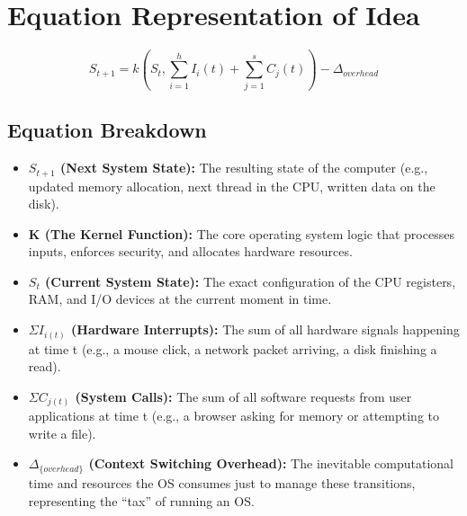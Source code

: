 \documentclass[11pt, a4paper]{article}
\begin{document}
\section*{Equation Representation of Idea}
\begin{equation}
    S_{t+1} = k \left( S_t, \sum_{i=1}^{h} I_i(t) + \sum_{j=1}^{s} C_j(t) \right) - \Delta_{overhead}
    \label{eq:os_state}
\end{equation}

\subsection*{Equation Breakdown}
\begin{itemize}
    \item \textbf{$S_{t+1}$ (Next System State):} The resulting state of the computer (e.g., updated memory allocation, next thread in the CPU, written data on the disk).
    \item \textbf{K (The Kernel Function):} The core operating system logic that processes inputs, enforces security, and allocates hardware resources.
    \item \textbf{$S_t$ (Current System State):} The exact configuration of the CPU registers, RAM, and I/O devices at the current moment in time.
    \item \textbf{$\Sigma I_{i(t)}$ (Hardware Interrupts):} The sum of all hardware signals happening at time t (e.g., a mouse click, a network packet arriving, a disk finishing a read).
    \item \textbf{$\Sigma C_{j(t)}$ (System Calls):} The sum of all software requests from user applications at time t (e.g., a browser asking for memory or attempting to write a file).
    \item \textbf{$\Delta_{\{overhead\}}$ (Context Switching Overhead):} The inevitable computational time and resources the OS consumes just to manage these transitions, representing the ``tax'' of running an OS.
\end{itemize}
\end{document}
